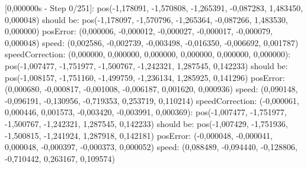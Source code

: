 [0,000000s - Step 0/251]:\newline 
\hspace{1cm}	pos(-1,178091, -1,570808, -1,265391, -0,087283, 1,483450, 0,000048) should be:\newline  
\hspace{1cm}	pos(-1,178097, -1,570796, -1,265364, -0,087266, 1,483530, 0,000000)\newline 
\hspace{1cm}	posError: (0,000006, -0,000012, -0,000027, -0,000017, -0,000079, 0,000048)\newline 
\hspace{1cm}	speed: (0,002586, -0,002739, -0,003498, -0,016350, -0,006692, 0,001787)\newline 
\hspace{1cm}	speedCorrection: (0,000000, 0,000000, 0,000000, 0,000000, 0,000000, 0,000000)\newline 
[1,512000s - Step 189/251]:\newline 
\hspace{1cm}	pos(-1,007477, -1,751977, -1,500767, -1,242321, 1,287545, 0,142233) should be: \newline 
\hspace{1cm}	pos(-1,008157, -1,751160, -1,499759, -1,236134, 1,285925, 0,141296)\newline 
\hspace{1cm}	posError: (0,000680, -0,000817, -0,001008, -0,006187, 0,001620, 0,000936)\newline 
\hspace{1cm}	speed: (0,090148, -0,096191, -0,130956, -0,719353, 0,253719, 0,110214)\newline 
\hspace{1cm}	speedCorrection: (-0,000061, 0,000446, 0,001573, -0,003420, -0,003991, 0,000369)\newline 
[1,520000s - Step 190/251]:\newline 
\hspace{1cm}	pos(-1,007477, -1,751977, -1,500767, -1,242321, 1,287545, 0,142233) should be: \newline 
\hspace{1cm}	pos(-1,007429, -1,751936, -1,500815, -1,241924, 1,287918, 0,142181)\newline 
\hspace{1cm}	posError: (-0,000048, -0,000041, 0,000048, -0,000397, -0,000373, 0,000052)\newline 
\hspace{1cm}	speed: (0,088489, -0,094440, -0,128806, -0,710442, 0,263167, 0,109574)\newline 
